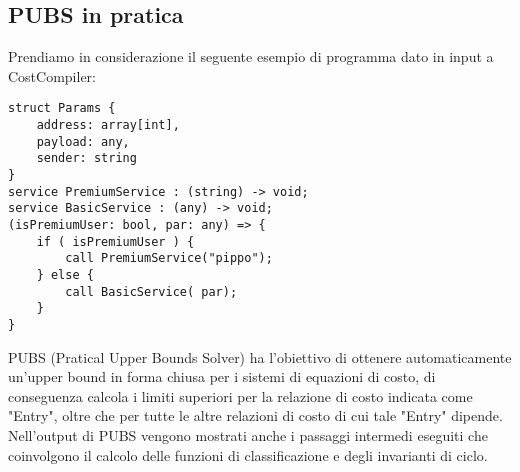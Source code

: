 \documentclass[../../main.tex]{subfiles}
\begin{document}
\subsection{PUBS in pratica}
Prendiamo in considerazione il seguente esempio di programma dato in input a CostCompiler:
\begin{lstlisting}[caption={Listing 1}]
struct Params {
	address: array[int],
	payload: any,
	sender: string
}
service PremiumService : (string) -> void;
service BasicService : (any) -> void;
(isPremiumUser: bool, par: any) => {
	if ( isPremiumUser ) {
		call PremiumService("pippo");
	} else {
		call BasicService( par);
	}
}
\end{lstlisting}

PUBS (Pratical Upper Bounds Solver) ha l'obiettivo di ottenere automaticamente un'upper bound in forma chiusa per i sistemi di equazioni di costo, di conseguenza calcola i limiti superiori per la relazione di costo indicata come "Entry", oltre che per tutte le altre relazioni di costo di cui tale "Entry" dipende.
Nell'output di PUBS vengono mostrati anche i passaggi intermedi eseguiti che coinvolgono il calcolo delle funzioni di classificazione e degli invarianti di ciclo.
\end{document}
